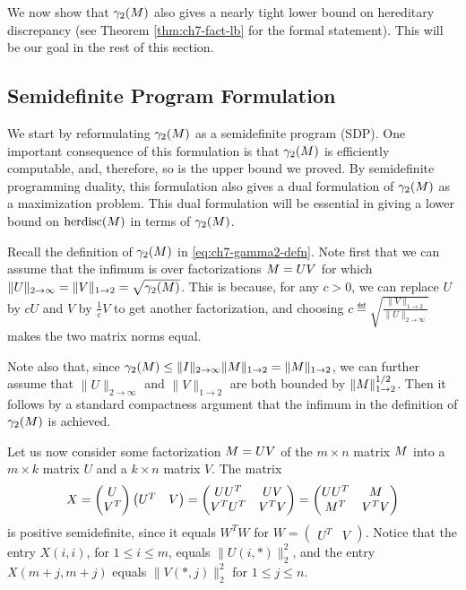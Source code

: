We now show that $\gamma_2(M)$ also gives a nearly tight
lower bound on hereditary discrepancy (see Theorem
\ref{thm:ch7-fact-lb} for the formal statement). This will be our goal in the rest of this section.

\subsection{Semidefinite Program Formulation}
We start  by reformulating
$\gamma_2(M)$ as a semidefinite program (SDP). One important
consequence of this formulation is that $\gamma_2(M)$ is
efficiently computable, and, therefore, so is the upper bound we
proved. By semidefinite programming duality, this formulation also gives a dual formulation of
$\gamma_2(M)$ as a maximization problem. This dual formulation will
be essential in giving a lower bound on $\operatorname{herdisc}(M)$ in terms of
$\gamma_2(M)$.

Recall the definition of $\gamma_2(M)$ in
\eqref{eq:ch7-gamma2-defn}. Note first that we can assume that the
infimum is over factorizations $M = UV$ for which
$\|U\|_{2\to\infty} = \|V\|_{1\to 2} = \sqrt{\gamma_2(M)}$. This is because, for any $c >
0$, we can replace $U$ by $cU$ and $V$ by $\frac1c V$ to get another
factorization, and choosing
$c \eqdef \sqrt{\frac{\|V\|_{1\to   2}}{\|U\|_{2\to\infty}}}$ makes
the two matrix norms equal.

Note also that, since $\gamma_2(M) \le \|I\|_{2\to \infty} \|M\|_{1\to 2}=  \|M\|_{1\to 2}$, we can
further assume that $\|U\|_{2\to\infty}$ and $\|V\|_{1\to 2}$ are both
bounded by $\|M\|_{1\to 2}^{1/2}$. Then it follows by a standard
compactness argument that the infimum in the definition of
$\gamma_2(M)$ is achieved. 

Let us now consider some factorization $M = UV$ of the $m\times n$
matrix $M$ into a $m \times k$ matrix $U$ and a $k\times n$ matrix
$V$. The matrix
\[
  X= \begin{pmatrix}
    U\\
    V^T
  \end{pmatrix}
  \begin{pmatrix}
    U^T  & V 
  \end{pmatrix}
  =
  \begin{pmatrix}
    UU^T & UV\\
    V^TU^T & V^T V
  \end{pmatrix}
  =
  \begin{pmatrix}
    UU^T & M\\
    M^T & V^T V
  \end{pmatrix}
\]
is positive semidefinite, since it equals $W^T W$ for
$W = \begin{pmatrix}U^T&  V\end{pmatrix}$. Notice that the entry $X(i,i)$, for 
$1 \le i \le m$, equals $\|U(i,*)\|_2^2$, and the entry $X(m + j,m+j)$  equals $\|V(*,j)\|_2^2$ for
$1 \le j \le n$.

